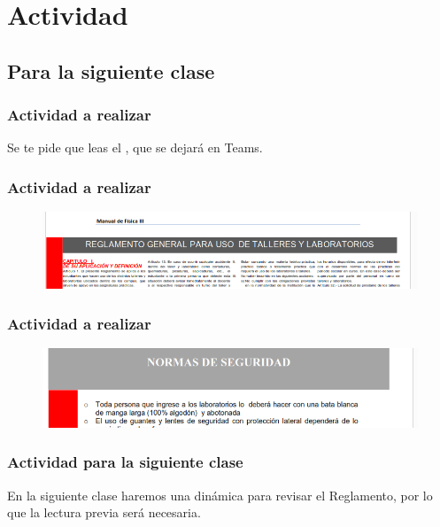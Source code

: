 \documentclass[14pt]{beamer}
\begin{document}
\section{Actividad}
\subsection{Para la siguiente clase}

\begin{frame}
\frametitle{Actividad a realizar}
Se te pide que leas el , que se dejará en Teams.
\end{frame}
\begin{frame}
\frametitle{Actividad a realizar}
\begin{figure}
\centering
\includegraphics[scale=0.7]{Imagenes/Reglamento_01.png}
\end{figure}
\end{frame}
\begin{frame}
\frametitle{Actividad a realizar}
\begin{figure}
\centering
\includegraphics[scale=0.7]{Imagenes/Reglamento_02.png}
\end{figure}
\end{frame}
\begin{frame}
\frametitle{Actividad para la siguiente clase}
En la siguiente clase haremos una dinámica para revisar el Reglamento, por lo que la lectura previa será necesaria.
\end{frame}
\end{document}
